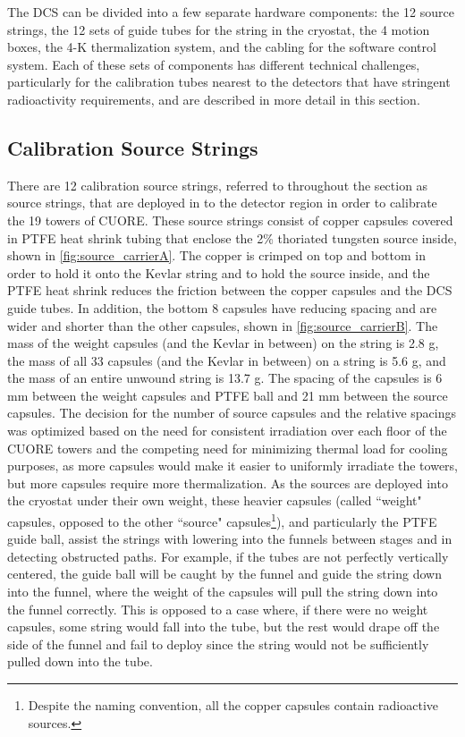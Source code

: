 The DCS can be divided into a few separate hardware components: the 12 source strings, the 12 sets of guide tubes for the string in the cryostat, the 4 motion boxes, the 4-K thermalization system, and the cabling for the software control system.
Each of these sets of components has different technical challenges, particularly for the calibration tubes nearest to the detectors that have stringent radioactivity requirements, and are described in more detail in this section.

\subsection*{Calibration Source Strings}
There are 12 calibration source strings, referred to throughout the section as source strings, that are deployed in to the detector region in order to calibrate the 19 towers of CUORE.
These source strings consist of copper capsules covered in PTFE heat shrink tubing that enclose the 2\% thoriated tungsten source inside, shown in \autoref{fig:source_carrierA}.
The copper is crimped on top and bottom in order to hold it onto the Kevlar string and to hold the source inside, and the PTFE heat shrink reduces the friction between the copper capsules and the DCS guide tubes. In addition, the bottom 8 capsules have reducing spacing and are wider and shorter than the other capsules, shown in \autoref{fig:source_carrierB}.
The mass of the weight capsules (and the Kevlar in between) on the string is 2.8 g, the mass of all 33 capsules (and the Kevlar in between) on a string is 5.6 g, and the mass of an entire unwound string is 13.7 g.
The spacing of the capsules is 6 mm between the weight capsules and PTFE ball and 21 mm between the source capsules.
The decision for the number of source capsules and the relative spacings was optimized based on the need for consistent irradiation over each floor of the CUORE towers and the competing need for minimizing thermal load for cooling purposes, as more capsules would make it easier to uniformly irradiate the towers, but more capsules require more thermalization.
As the sources are deployed into the cryostat under their own weight, these heavier capsules (called ``weight" capsules, opposed to the other ``source" capsules\footnote{Despite the naming convention, all the copper capsules contain radioactive sources.}), and particularly the PTFE guide ball, assist the strings with lowering into the funnels between stages and in detecting obstructed paths.
For example, if the tubes are not perfectly vertically centered, the guide ball will be caught by the funnel and guide the string down into the funnel, where the weight of the capsules will pull the string down into the funnel correctly.
This is opposed to a case where, if there were no weight capsules, some string would fall into the tube, but the rest would drape off the side of the funnel and fail to deploy since the string would not be sufficiently pulled down into the tube.

